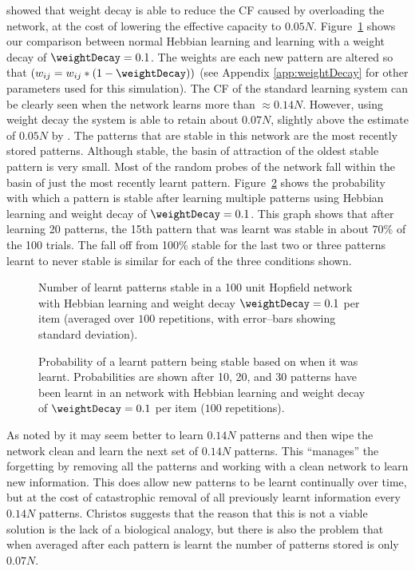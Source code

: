 \citet{Christos96} showed that weight decay is able to reduce the CF caused by overloading the network, at the cost of lowering the effective capacity to $0.05N$.  Figure~\ref{fig:WeightDecay100num} shows our comparison between normal Hebbian learning and learning with a weight decay of $\weightDecay = 0.1$. The weights are each new pattern are altered so that $( w_{ij} = w_{ij}*(1-\weightDecay))$ (see Appendix \ref{app:weightDecay} for other parameters used for this simulation).  The CF of the standard learning system can be clearly seen when the network learns more than $\approx 0.14N$.  However, using weight decay the system is able to retain about $0.07N$, slightly above the estimate of $0.05N$ by \citet{Nadal1986}.  The patterns that are stable in this network are the most recently stored patterns.  Although stable, the basin of attraction of the oldest stable pattern is very small. Most of the random probes of the network fall within the basin of just the most recently learnt pattern.  Figure~\ref{fig:WeightDecay100pos} shows the probability with which a pattern is stable after learning multiple patterns using Hebbian learning and weight decay of $\weightDecay = 0.1$. This graph shows that after learning 20 patterns, the 15th pattern that was learnt was stable in about $70\%$ of the 100 trials. The fall off from 100\% stable for the last two or three patterns learnt to never stable is similar for each of the three conditions shown. 

\begin{figure}[tbp]
\small
\center
	
	\caption{Number of learnt patterns stable in a 100 unit Hopfield network  with Hebbian learning and weight decay $\weightDecay = 0.1$ per item (averaged over $100$ repetitions, with error--bars showing standard deviation).}
	\label{fig:WeightDecay100num}
\end{figure}

\begin{figure}[tbp]
\small
\center
	
	\caption{Probability of a learnt pattern being stable based on when it was learnt.  Probabilities are shown after 10, 20, and 30 patterns have been learnt in an  network with Hebbian learning and weight decay of $\weightDecay = 0.1$ per item ($100$ repetitions).}
	\label{fig:WeightDecay100pos}
\end{figure}

As noted by \citet{Christos96} it may seem better to learn $0.14N$ patterns and then wipe the network clean and learn the next set of $0.14N$ patterns.  This ``manages'' the forgetting by removing all the patterns and working with a clean network to learn new information.  This does allow new patterns to be learnt continually over time, but at the cost of catastrophic removal of all previously learnt information every $0.14N$ patterns.  Christos suggests that the reason that this is not a viable solution is the lack of a biological analogy, but there is also the problem that when averaged after each pattern is learnt the number of patterns stored is only $0.07N$.

